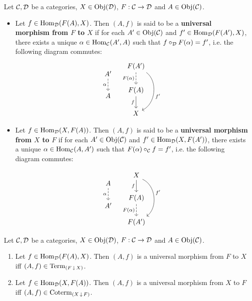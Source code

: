 \documentclass{book}
\begin{document}
	\begin{defn} 
		Let $\mathcal{C}, \mathcal{D}$ be a categories, $X \in \operatorname{Obj}(\mathcal{D})$, $F: \mathcal{C} \rightarrow \mathcal{D}$ and $A \in \operatorname{Obj}(\mathcal{C})$.
		\begin{itemize}
			\item Let $f \in \operatorname{Hom}_{\mathcal{D}}(F(A), X)$. Then $(A, f)$ is said to be a \textbf{universal morphism from $F$ to $X$} if for each $A' \in \operatorname{Obj}(\mathcal{C})$ and $f' \in \operatorname{Hom}_{\mathcal{D}}(F(A'), X)$, there exists a unique $\alpha \in \operatorname{Hom}_{\mathcal{C}}(A', A)$ such that $f \circ_{\mathcal{D}} F(\alpha) = f'$, i.e. the following diagram commutes:
			\[ 
			\begin{tikzcd}
				A' \arrow[d, "\al"', dashed] \\
				A  
			\end{tikzcd}
			\quad
			\begin{tikzcd}[baseline= 7]
				F(A')  \arrow[d, "F(\al)"', dashed]  \arrow[dd, "f'"', bend left=60, swap]   \\
				F(A) \arrow[d, "f"']                       \\
				X
			\end{tikzcd}
			\] 
			\item Let $f \in \operatorname{Hom}_{\mathcal{D}}(X, F(A))$. Then $(A, f)$ is said to be a \textbf{universal morphism from $X$ to $F$} if for each $A' \in \operatorname{Obj}(\mathcal{C})$ and $f' \in \operatorname{Hom}_{\mathcal{D}}(X, F(A'))$, there exists a unique $\alpha \in \operatorname{Hom}_{\mathcal{C}}(A, A')$ such that $F(\alpha) \circ_{\mathcal{C}} f = f'$, i.e. the following diagram commutes:
			
			\[ 
			\begin{tikzcd}
				A \arrow[d, "\al"', dashed] \\
				A'  
			\end{tikzcd}
			\quad
			\begin{tikzcd}[baseline= 7]
				X  \arrow[d, "f"']  \arrow[dd, "f'"', bend left=60, swap]   \\
				F(A) \arrow[d, "F(\al)"', dashed]                       \\
				F(A')
			\end{tikzcd}
			\] 
		\end{itemize}
	\end{defn}
	
	\begin{ex} 
		Let $\mathcal{C}, \mathcal{D}$ be a categories, $X \in \operatorname{Obj}(\mathcal{D})$, $F: \mathcal{C} \rightarrow \mathcal{D}$ and $A \in \operatorname{Obj}(\mathcal{C})$.
		\begin{enumerate}
			\item Let $f \in \operatorname{Hom}_{\mathcal{D}}(F(A), X)$. Then $(A, f)$ is a universal morphism from $F$ to $X$ iff $(A, f) \in \operatorname{\text{Term}}_{(F \operatorname{\downarrow} X)}$.
			\item Let $f \in \operatorname{Hom}_{\mathcal{D}}(X, F(A))$. Then $(A, f)$ is a universal morphism from $X$ to $F$ iff $(A, f) \in \operatorname{Coterm}_{(X \operatorname{\downarrow} F)}$.
		\end{enumerate}
	\end{ex}
	
\end{document}
